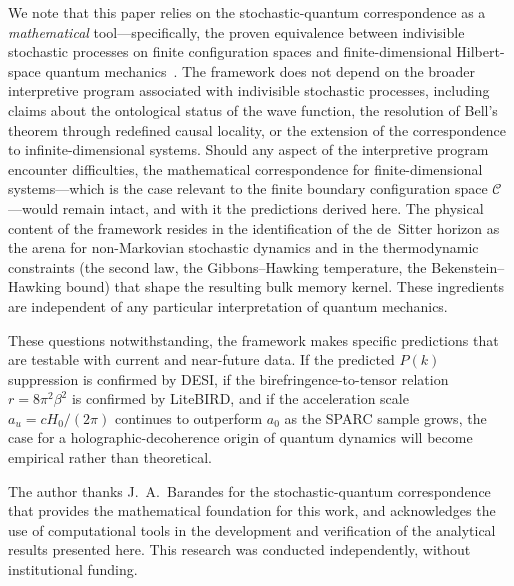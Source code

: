 \documentclass[aps,prd,twocolumn,superscriptaddress,nofootinbib]{revtex4-2}
\begin{document}
We note that this paper relies on the stochastic-quantum correspondence as a \emph{mathematical} tool---specifically, the proven equivalence between indivisible stochastic processes on finite configuration spaces and finite-dimensional Hilbert-space quantum mechanics~\cite{Barandes2025SQT}. The framework does not depend on the broader interpretive program associated with indivisible stochastic processes, including claims about the ontological status of the wave function, the resolution of Bell's theorem through redefined causal locality, or the extension of the correspondence to infinite-dimensional systems. Should any aspect of the interpretive program encounter difficulties, the mathematical correspondence for finite-dimensional systems---which is the case relevant to the finite boundary configuration space $\mathcal{C}$---would remain intact, and with it the predictions derived here. The physical content of the framework resides in the identification of the de~Sitter horizon as the arena for non-Markovian stochastic dynamics and in the thermodynamic constraints (the second law, the Gibbons--Hawking temperature, the Bekenstein--Hawking bound) that shape the resulting bulk memory kernel. These ingredients are independent of any particular interpretation of quantum mechanics.

These questions notwithstanding, the framework makes specific predictions that are testable with current and near-future data. If the predicted $P(k)$ suppression is confirmed by DESI, if the birefringence-to-tensor relation $r = 8\pi^2\beta^2$ is confirmed by LiteBIRD, and if the acceleration scale $a_u = cH_0/(2\pi)$ continues to outperform $a_0$ as the SPARC sample grows, the case for a holographic-decoherence origin of quantum dynamics will become empirical rather than theoretical.


\begin{acknowledgments}
The author thanks J.~A.~Barandes for the stochastic-quantum correspondence that provides the mathematical foundation for this work, and acknowledges the use of computational tools in the development and verification of the analytical results presented here. This research was conducted independently, without institutional funding.
\end{acknowledgments}
\end{document}
